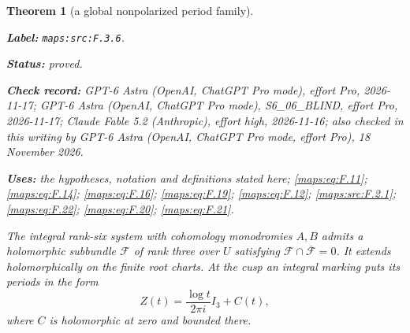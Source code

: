 \documentclass[11pt,a4paper]{article}
\newtheorem{theorem}{Theorem}[section]
\theoremstyle{definition}
\newcommand{\StatementRecord}[4]{\par\smallskip\begingroup\upshape\raggedright\noindent\textbf{Label:} \nolinkurl{#1}.\par\noindent\textbf{Status:} #2.\par\noindent\textbf{Check record:} #3.\par\noindent\textbf{Uses:} #4.\par\endgroup\smallskip}
\newcommand{\CurrentChecker}{GPT-6 Astra (OpenAI, ChatGPT Pro mode, effort Pro), 18 November 2026}
\begin{document}
\begin{theorem}[a global nonpolarized period family]\label{maps:src:F.3.6}
\StatementRecord{maps:src:F.3.6}{proved}{GPT-6 Astra (OpenAI, ChatGPT Pro mode), effort Pro, 2026-11-17; GPT-6 Astra (OpenAI, ChatGPT Pro mode), S6\_06\_BLIND, effort Pro, 2026-11-17; Claude Fable 5.2 (Anthropic), effort high, 2026-11-16; also checked in this writing by \CurrentChecker}{the hypotheses, notation and definitions stated here; \cref{maps:eq:F.11}; \cref{maps:eq:F.14}; \cref{maps:eq:F.16}; \cref{maps:eq:F.19}; \cref{maps:eq:F.12}; \cref{maps:src:F.2.1}; \cref{maps:eq:F.22}; \cref{maps:eq:F.20}; \cref{maps:eq:F.21}}


The integral rank-six system with cohomology monodromies $A,B$
admits a holomorphic subbundle $\mathcal F$ of rank three over
$U$ satisfying $\mathcal F\cap\overline{\mathcal F}=0$.
It extends holomorphically on the finite root charts.  At the
cusp an integral marking puts its periods in the form
\[
 Z(t)=\frac{\log t}{2\pi i}I_3+C(t),
 \tag{F.13}\label{maps:eq:F.13}
\]
where $C$ is holomorphic at zero and bounded there.

\end{theorem}
\end{document}
